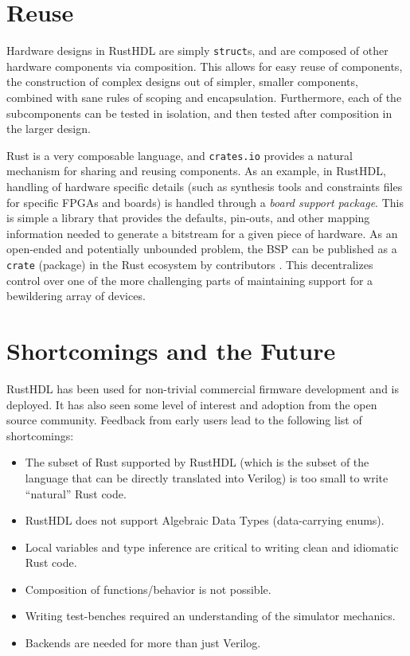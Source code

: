 \documentclass[sigplan,screen,sigconf]{acmart}
\begin{document}
\section{Reuse}
Hardware designs in RustHDL are simply \verb|struct|s, and are composed of other 
hardware components via composition.  This allows for easy reuse of components, the
construction of complex designs out of simpler, smaller components, combined with sane rules of
scoping and encapsulation.  Furthermore, each of the subcomponents can be tested in 
isolation, and then tested after composition in the larger design. 

Rust is a very composable language, and \verb|crates.io| provides a natural mechanism
for sharing and reusing components.  As an example, in RustHDL, handling of hardware specific
details (such as synthesis tools and constraints files for specific FPGAs and boards) is 
handled through a \emph{board support package}.  This is simple a library that provides the
defaults, pin-outs, and other mapping information needed to generate a bitstream for a given piece of
hardware.  As an open-ended and potentially unbounded problem, the BSP can be published as
a \verb|crate| (package) in the Rust ecosystem by contributors \cite{b7}.  This decentralizes control
over one of the more challenging parts of maintaining support for a bewildering array of 
devices. 

\section{Shortcomings and the Future}
RustHDL has been used for non-trivial commercial firmware development and is deployed.  It has also seen 
some level of interest and adoption from the open source community.  Feedback from early users 
lead to the following list of shortcomings:

\begin{itemize}
  \item The subset of Rust supported by RustHDL (which is the subset of the language that can be 
  directly translated into Verilog) is too small to write ``natural'' Rust code. 
  \item RustHDL does not support Algebraic Data Types (data-carrying enums).
  \item Local variables and type inference are critical to writing clean and
  idiomatic Rust code.  
  \item Composition of functions/behavior is not possible. 
  \item Writing test-benches required an understanding of the simulator mechanics.
  \item Backends are needed for more than just Verilog.
\end{itemize}
\end{document}

